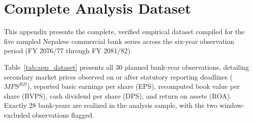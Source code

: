 \chapter{Complete Analysis Dataset}
\label{app:analysis_dataset}

This appendix presents the complete, verified empirical dataset compiled for the five sampled Nepalese commercial bank series across the six-year observation period (FY 2076/77 through FY 2081/82). 

Table~\ref{tab:app_dataset} presents all 30 planned bank-year observations, detailing secondary market prices observed on or after statutory reporting deadlines ($\mathit{MPS}^{RD}$), reported basic earnings per share (EPS), recomputed book value per share (BVPS), cash dividend per share (DPS), and return on assets (ROA). Exactly 28 bank-years are realized in the analysis sample, with the two window-excluded observations flagged.

